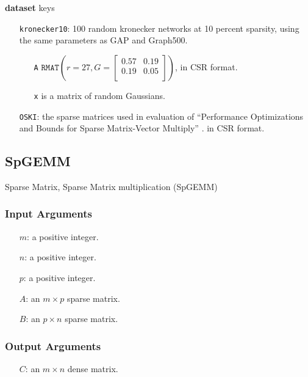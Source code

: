 \documentclass{article}
\begin{document}
\textbf{dataset} keys
\begin{itemize}
	\item[\texttt{kronecker10}:] 100 random kronecker networks at 10 percent sparsity, using the
	same parameters as GAP and Graph500\cite{noauthor_graph_nodate}.
	\begin{itemize}
		\item[\texttt{A}] $\texttt{RMAT}\left(r=27, G = \left[\begin{array}{cc}
			0.57 & 0.19 \\
			0.19 & 0.05 \\
		\end{array}\right]\right)$, in CSR format.

        \item[\texttt{x}] is a matrix of random Gaussians.
	\end{itemize}
	\item[\texttt{OSKI}:] the sparse matrices used in evaluation of
	``Performance Optimizations and Bounds for Sparse Matrix-Vector Multiply'' \cite{vuduc_performance_2002}. in CSR format.
\end{itemize}



\subsection{SpGEMM}
Sparse Matrix, Sparse Matrix multiplication (SpGEMM)
\subsubsection{Input Arguments}

\begin{itemize}
	\item[$m$:] a positive integer.
	\item[$n$:] a positive integer.
	\item[$p$:] a positive integer.
	\item[$A$:] an $m \times p$ sparse matrix.
	\item[$B$:] an $p \times n$ sparse matrix.
\end{itemize}

\subsubsection{Output Arguments}

\begin{itemize}
	\item[$C$:] an $m \times n$ dense matrix.
\end{itemize}
\end{document}

